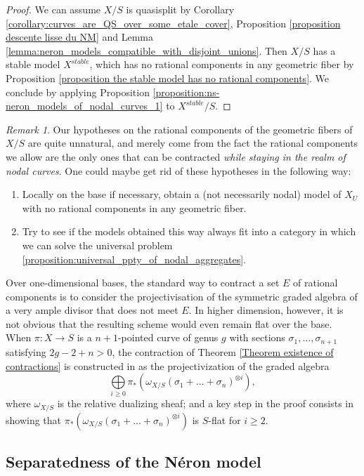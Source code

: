 \documentclass[a4paper,12pt]{amsart} %
\numberwithin{equation}{subsection}
\theoremstyle{definition}
\theoremstyle{plain}%
\theoremstyle{remark}
\newtheorem{remark}[definition]{Remark}
\begin{document}
\begin{proof}
We can assume $X/S$ is quasisplit by Corollary \ref{corollary:curves_are_QS_over_some_etale_cover}, Proposition \ref{proposition descente lisse du NM} and Lemma \ref{lemma:neron_models_compatible_with_disjoint_unions}. Then $X/S$ has a stable model $X^{stable}$, which has no rational components in any geometric fiber by Proposition \ref{proposition the stable model has no rational components}. We conclude by applying Proposition \ref{proposition:ns-neron_models_of_nodal_curves_1} to $X^{stable}/S$.
\end{proof}

\begin{remark}
Our hypotheses on the rational components of the geometric fibers of $X/S$ are quite unnatural, and merely come from the fact the rational components we allow are the only ones that can be contracted \emph{while staying in the realm of nodal curves}. One could maybe get rid of these hypotheses in the following way:
\begin{enumerate}
\item Locally on the base if necessary, obtain a (not necessarily nodal) model of $X_U$ with no rational components in any geometric fiber.
\item Try to see if the models obtained this way always fit into a category in which we can solve the universal problem \ref{proposition:universal_ppty_of_nodal_aggregates}.
\end{enumerate}
Over one-dimensional bases, the standard way to contract a set $E$ of rational components is to consider the projectivisation of the symmetric graded algebra of a very ample divisor that does not meet $E$. In higher dimension, however, it is not obvious that the resulting scheme would even remain flat over the base. When $\pi\colon X \to S$ is a $n+1$-pointed curve of genus $g$ with sections $\sigma_1,...,\sigma_{n+1}$ satisfying $2g-2+n>0$, the contraction of Theorem \ref{Theorem existence of contractions} is constructed in \cite{Knudsen} as the projectivization of the graded algebra
\[
\bigoplus\limits_{i\geq 0}\pi_*(\omega_{X/S}(\sigma_1+...+\sigma_n)^{\otimes i}),
\]
where $\omega_{X/S}$ is the relative dualizing sheaf; and a key step in the proof consists in showing that $\pi_*(\omega_{X/S}(\sigma_1+...+\sigma_n)^{\otimes i})$ is $S$-flat for $i\geq 2$.
\end{remark}

\subsection{Separatedness of the N\'eron model}
\end{document}
